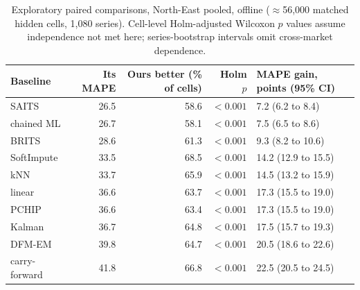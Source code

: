 \begin{table}[tbp]
\caption{Exploratory paired comparisons, North-East pooled, offline ($\approx$56{,}000 matched hidden cells, 1{,}080 series). Cell-level Holm-adjusted Wilcoxon $p$ values assume independence not met here; series-bootstrap intervals omit cross-market dependence.}
\label{tab:tests}
\small
\begin{tabular}{lrrrl}
\toprule
Baseline & Its MAPE & Ours better (\% of cells) & Holm $p$ & MAPE gain, points (95\% CI) \\
\midrule
SAITS & 26.5 & 58.6 & $<0.001$ & 7.2 (6.2 to 8.4) \\
chained ML & 26.7 & 58.1 & $<0.001$ & 7.5 (6.5 to 8.6) \\
BRITS & 28.6 & 61.3 & $<0.001$ & 9.3 (8.2 to 10.6) \\
SoftImpute & 33.5 & 68.5 & $<0.001$ & 14.2 (12.9 to 15.5) \\
kNN & 33.7 & 65.9 & $<0.001$ & 14.5 (13.2 to 15.9) \\
linear & 36.6 & 63.7 & $<0.001$ & 17.3 (15.5 to 19.0) \\
PCHIP & 36.6 & 63.4 & $<0.001$ & 17.3 (15.5 to 19.0) \\
Kalman & 36.7 & 64.8 & $<0.001$ & 17.5 (15.7 to 19.3) \\
DFM-EM & 39.8 & 64.7 & $<0.001$ & 20.5 (18.6 to 22.6) \\
carry-forward & 41.8 & 66.8 & $<0.001$ & 22.5 (20.5 to 24.5) \\
\bottomrule
\end{tabular}
\end{table}
